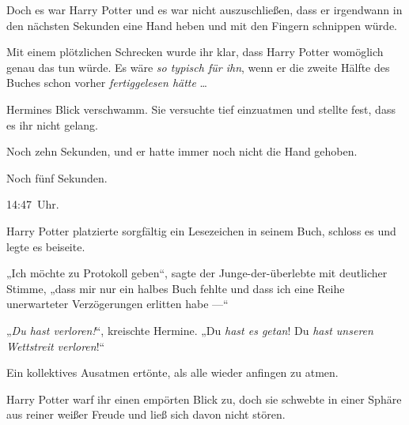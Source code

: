 Doch es war Harry Potter und es war nicht auszuschließen, dass er irgendwann in den nächsten Sekunden eine Hand heben und mit den Fingern schnippen würde.

Mit einem plötzlichen Schrecken wurde ihr klar, dass Harry Potter womöglich genau das tun würde. Es wäre \emph{so typisch für ihn}, wenn er die zweite Hälfte des Buches schon vorher \emph{fertiggelesen hätte} …

Hermines Blick verschwamm. Sie versuchte tief einzuatmen und stellte fest, dass es ihr nicht gelang.

Noch zehn Sekunden, und er hatte immer noch nicht die Hand gehoben.

Noch fünf Sekunden.

14:47~Uhr.

Harry Potter platzierte sorgfältig ein Lesezeichen in seinem Buch, schloss es und legte es beiseite.

„Ich möchte zu Protokoll geben“, sagte der Junge-der-überlebte mit deutlicher Stimme, „dass mir nur ein halbes Buch fehlte und dass ich eine Reihe unerwarteter Verzögerungen erlitten habe —“

„\emph{Du hast verloren!}“, kreischte Hermine.
„Du \emph{hast es getan}! Du \emph{hast unseren Wettstreit verloren}!“

Ein kollektives Ausatmen ertönte, als alle wieder anfingen zu atmen.

Harry Potter warf ihr einen empörten Blick zu, doch sie schwebte in einer Sphäre aus reiner weißer Freude und ließ sich davon nicht stören.

